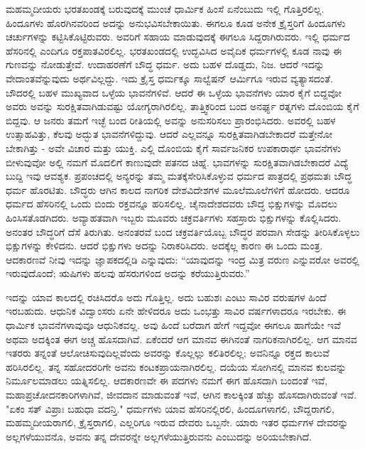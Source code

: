 ಮಹಮ್ಮದೀಯರು ಭರತಖಂಡಕ್ಕೆ ಬರುವುದಕ್ಕೆ ಮುಂಚೆ ಧಾರ್ಮಿಕ ಹಿಂಸೆ ಏನೆಂಬುದು ಇಲ್ಲಿ ಗೊತ್ತಿರಲಿಲ್ಲ. ಹಿಂದೂಗಳು ಹೊರಗಿನವರಿಂದ ಅದನ್ನು ಅನುಭವಿಸಬೇಕಾಯಿತು. ಈಗಲೂ ಕೂಡ ಅನೇಕ ಕ್ರೈಸ್ತರಿಗೆ ಹಿಂದೂಗಳು ಚರ್ಚುಗಳನ್ನು ಕಟ್ಟಿಸಿಕೊಟ್ಟಿರುವರು. ಅವರಿಗೆ ಸಹಾಯ ಮಾಡುವುದಕ್ಕೆ ಈಗಲೂ ಸಿದ್ದರಾಗಿರುವರು. ಇಲ್ಲಿ ಧರ್ಮದ ಹೆಸರಿನಲ್ಲಿ ಎಂದಿಗೂ ರಕ್ತಪಾತವಿರಲಿಲ್ಲ. ಭರತಖಂಡದಲ್ಲಿ ಉದ್ಭವಿಸಿದ ಅವೈದಿಕ ಧರ್ಮಗಳಲ್ಲಿ ಕೂಡ ನಾವು ಈ ಗುಣವನ್ನು ನೋಡುತ್ತೇವೆ. ಉದಾಹರಣೆಗೆ ಬೌದ್ಧ ಧರ್ಮ. ಅದು ಬಹಳ ದೊಡ್ಡದು, ನಿಜ. ಆದರೆ ಇದನ್ನು ವೇದಾಂತವೆನ್ನುವುದು ಅರ್ಥವಿಲ್ಲದ್ದು. ಇದು ಕ್ರೈಸ್ತ ಧರ್ಮಕ್ಕೂ ಸಾಲ್ವೆಷನ್ ಆರ್ಮಿಗೂ ಇರುವ ವ್ಯತ್ಯಾಸದಂತೆ. ಬೌದರಲ್ಲಿ ಬಹಳ ಮುಖ್ಯವಾದ ಒಳ್ಳೆಯ ಭಾವನೆಗಳಿವೆ. ಆದರೆ ಈ ಒಳ್ಳೆಯ ಭಾವನೆಗಳು ಯಾರ ಕೈಗೆ ಬಿದ್ದವೋ ಅವರು ಅವನ್ನು ಸುರಕ್ಷಿತವಾಗಿಡುವಷ್ಟು ಯೋಗ್ಯರಾಗಿರಲಿಲ್ಲ. ತಾತ್ತ್ವಿಕರಿಂದ ಬಂದ ಅನರ್ಘ್ಯ ರತ್ನಗಳು ದೊಂಬಿಯ ಕೈಗೆ ಬಿದ್ದವು. ಆ ಜನರು ತಮಗೆ ಇಚ್ಛೆ ಬಂದ ರೀತಿಯಲ್ಲಿ ಅವನ್ನು ಅನುಸರಿಸಲು ಪ್ರಾರಂಭಿಸಿದರು. ಅವರಲ್ಲಿ ಬಹಳ ಉತ್ಸಾಹವಿತ್ತು, ಕೆಲವು ಅದ್ಭುತ ಭಾವನೆಗಳಿದ್ದುವು. ಆದರೆ ಎಲ್ಲವನ್ನೂ ಸುರಕ್ಷಿತವಾಗಿಡಬೇಕಾದರೆ ಮತ್ತೇನೋ ಬೇಕಾಗಿತ್ತು - ಅವೇ ವಿಚಾರ ಮತ್ತು ಯುಕ್ತಿ. ಎಲ್ಲಿ ದೊಂಬಿಯ ಕೈಗೆ ಸಾರ್ವಜನಿಕರ ಉಪಕಾರಾರ್ಥ ಭಾವನೆಗಳು ಬೀಳುವುವೋ ಅಲ್ಲಿ ನಮಗೆ ಮೊದಲಿಗೆ ಕಾಣುವುದೇ ಪತನದ ಚಿಹ್ನೆ. ಭಾವಗಳನ್ನು ಸುರಕ್ಷಿತವಾಗಿಡಬೇಕಾದರೆ ವಿದ್ಯೆ ಬುದ್ದಿ ಇವು ಆವಶ್ಯಕ. ಪ್ರಪಂಚದಲ್ಲಿ ಅನ್ಯರನ್ನು ತಮ್ಮ ಮತಕ್ಕೆ\break ಸೇರಿಸಿಕೊಳ್ಳುವ ಧರ್ಮದ ಪಾತ್ರದಲ್ಲಿ ಪ್ರಥಮತಃ ಬೌದ್ಧ ಧರ್ಮ ಹೊರಟಿತು. ಬೌದ್ಧರು ಆಗಿನ ಕಾಲದ ನಾಗರಿಕ ದೇಶವಿದೇಶಗಳ ಮೂಲೆಮೂಲೆಗಳಿಗೆ ಹೋದರು. ಆದರೂ ಧರ್ಮದ ಹೆಸರಿನಲ್ಲಿ ಒಂದು ಬಿಂದು ರಕ್ತವನ್ನೂ ಹರಿಸಲಿಲ್ಲ. ಚೈನಾದೇಶದವರು ಬೌದ್ಧ ಭಿಕ್ಷುಗಳನ್ನು ಮೊದಲು ಹಿಂಸಿಸತೊಡಗಿದರು. ಅವ್ಯಾಹತವಾಗಿ ಇಬ್ಬರು ಮೂವರು ಚಕ್ರವರ್ತಿಗಳು ಸಹಸ್ರಾರು ಭಿಕ್ಷುಗಳನ್ನು ಕೊಲ್ಲಿಸಿದರು. ಅನಂತರ ಬೌದ್ಧರಿಗೆ ದೆಸೆ ತಿರುಗಿತು. ಅನಂತರವೆ ಬಂದ ಚಕ್ರವರ್ತಿಯೊಬ್ಬ ಬೌದ್ಧರ ಪರವಾಗಿ ಸೇಡನ್ನು ತೀರಿಸಿಕೊಳ್ಳಲು ಭಿಕ್ಷುಗಳನ್ನು ಕೇಳಿದನು. ಆದರೆ ಭಿಕ್ಷುಗಳು ಅದನ್ನು ನಿರಾಕರಿಸಿದರು. ಅದಕ್ಕೆಲ್ಲ ಕಾರಣ ಈ ಒಂದು ಮಂತ್ರ. ಆದಕಾರಣವೆ ನೀವು ಇದನ್ನು ಜ್ಞಾಪಕದಲ್ಲಿಡಿ ಎನ್ನುವುದು: “ಯಾವುದನ್ನು ಇಂದ್ರ ಮಿತ್ರ ವರುಣ ಎನ್ನುವರೋ ಅವರಲ್ಲಿ ಇರುವುದೊಂದೆ; ಋಷಿಗಳು ಹಲವು ಹೆಸರುಗಳಿಂದ ಅದನ್ನು ಕರೆಯುತ್ತಿರುವರು.”

ಇದನ್ನು ಯಾವ ಕಾಲದಲ್ಲಿ ರಚಿಸಿದರೊ ಅದು ಗೊತ್ತಿಲ್ಲ. ಅದು ಬಹುಶಃ ಎಂಟು ಸಾವಿರ ವರುಷಗಳ ಹಿಂದೆ ಇರಬಹುದು. ಆಧುನಿಕ ವಿದ್ವಾಂಸರು ಏನೇ ಹೇಳಿದರೂ ಅದು ಒಂಭತ್ತು ಸಾವಿರ ವರ್ಷಗಳಾದರೂ ಇರಬೇಕು. ಈ ಧಾರ್ಮಿಕ ಭಾವನೆಗಳಾವುವೂ ಆಧುನಿಕವಲ್ಲ. ಅವು ಹಿಂದೆ ಬರೆದಾಗ ಹೇಗೆ ಇದ್ದವೋ ಈಗಲೂ ಹಾಗೆಯೇ ಇವೆ ಅಥವಾ ಅದಕ್ಕಿಂತ ಈಗ ಅಚ್ಚ ಹೊಸದಾಗಿವೆ. ಏಕೆಂದರೆ ಆಗ ಮಾನವ ಈಗಿನಂತೆ ನಾಗರಿಕನಾಗಿರಲಿಲ್ಲ. ಆಗ ಮಾನವ ಇತರರು ತನ್ನಂತೆ ಆಲೋಚಿಸುವುದಿಲ್ಲವೆಂದು ಅವರನ್ನು ಕೊಲ್ಲಲ್ಲು ಕಲಿತಿರಲಿಲ್ಲ; ಅವನಿನ್ನೂ ರಕ್ತದ ಕಾಲುವೆ ಹರಿಸಿರಲಿಲ್ಲ. ತನ್ನ ಸಹೋದರರಿಗೇ ಅವನು ಕಂಟಕಪ್ರಾಯನಾಗಿರಲಿಲ್ಲ. ದಯೆಯ ಸೋಗಿನಲ್ಲಿ ಮಾನವ ಕುಲವನ್ನು ನಿರ್ಮೂಲಮಾಡಲು ಯತ್ನಿಸಲಿಲ್ಲ. ಆದಕಾರಣವೇ ಈ ಪದಗಳು ನಮಗೆ ಈಗ ಹೊಸದಾಗಿ ಬಂದಂತೆ ಇವೆ, ಮಹಾಪ್ರಚೋದನಕಾರಿಗಳಾಗಿವೆ, ಜೀವದಾನ ಮಾಡುವಂತೆ ಇವೆ, ಆಗಿನ ಕಾಲಕ್ಕಿಂತ ಹೆಚ್ಚು ಹೊಸದಾಗಿರುವಂತೆ ಇವೆ. "ಏಕಂ ಸತ್ ವಿಪ್ರಾಃ ಬಹುಧಾ ವದನ್ತಿ." ಧರ್ಮಗಳು ಯಾವ ಹೆಸರಿನಲ್ಲಿರಲಿ, ಹಿಂದೂಗಳಾಗಲಿ, ಬೌದ್ದರಾಗಲಿ, ಮಹಮ್ಮದೀಯರಾಗಲಿ, ಕ್ರೈಸ್ತರಾಗಲಿ, ಎಲ್ಲರಿಗೂ ಇರುವ ದೇವರು ಒಬ್ಬನೇ. ಯಾರು ಇತರ ಧರ್ಮಗಳ ದೇವರನ್ನು ಅಲ್ಲಗಳೆಯುವನೊ, ಅವನು ತನ್ನ ದೇವರನ್ನೇ ಅಲ್ಲಗಳೆಯುತ್ತಿರುವನು ಎಂಬುದನ್ನು ಅರಿಯಬೇಕಾಗಿದೆ.

